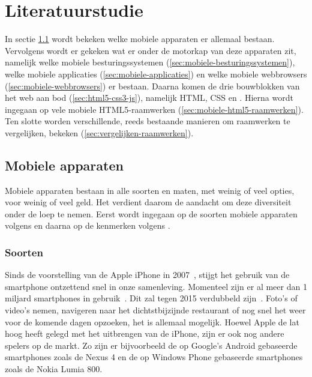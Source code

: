 \chapter{Literatuurstudie}
\label{chap:literatuurstudie}
In sectie \ref{sec:mobiele-apparaten} wordt bekeken welke mobiele apparaten er allemaal bestaan. 
Vervolgens wordt er gekeken wat er onder de motorkap van deze apparaten zit, namelijk welke mobiele besturingssystemen (\ref{sec:mobiele-besturingssystemen}), welke mobiele applicaties (\ref{sec:mobiele-applicaties}) en welke mobiele webbrowsers (\ref{sec:mobiele-webbrowsers}) er bestaan. 
Daarna komen de drie bouwblokken van het web aan bod (\ref{sec:html5-css3-js}), namelijk HTML, CSS en \js{}.
Hierna wordt ingegaan op vele mobiele HTML5-raamwerken (\ref{sec:mobiele-html5-raamwerken}).  
Ten slotte worden verschillende, reeds bestaande manieren om raamwerken te vergelijken, bekeken (\ref{sec:vergelijken-raamwerken}).


\section{Mobiele apparaten}
\label{sec:mobiele-apparaten}
Mobiele apparaten bestaan in alle soorten en maten, met weinig of veel opties, voor weinig of veel geld. 
Het verdient daarom de aandacht om deze diversiteit onder de loep te nemen. 
Eerst wordt ingegaan op de soorten mobiele apparaten volgens \cite{GCF2013} en daarna op de kenmerken volgens \cite{PhilDutson2012}.

\subsection{Soorten}
Sinds de voorstelling van de Apple iPhone in 2007~\cite{David2011}, stijgt het gebruik van de smartphone ontzettend snel in onze samenleving.  
Momenteel zijn er al meer dan 1 miljard smartphones in gebruik~\cite{Yang2012}. 
Dit zal tegen 2015 verdubbeld zijn~\cite{Gillett2012}.
Foto's of video's nemen, navigeren naar het dichtstbijzijnde restaurant of nog snel het weer voor de komende dagen opzoeken, het is allemaal mogelijk. 
Hoewel Apple de lat hoog heeft gelegd met het uitbrengen van de iPhone, zijn er ook nog andere spelers op de markt. 
Zo zijn er bijvoorbeeld de op Google's Android gebaseerde smartphones zoals de Nexus 4 en de op Windows Phone gebaseerde smartphones zoals de Nokia Lumia 800.

